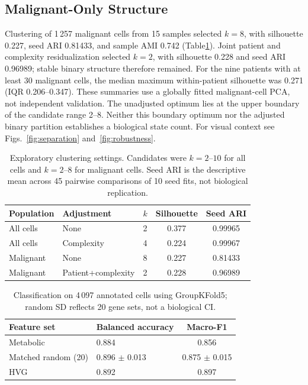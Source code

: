 \subsection{Malignant-Only Structure}
Clustering of 1\,257 malignant cells from 15 samples selected $k=8$, with silhouette 0.227, seed ARI 0.81433, and sample AMI 0.742 (Table\ref{tab:clustering}). Joint patient and complexity residualization selected $k=2$, with silhouette 0.228 and seed ARI 0.96989; stable binary structure therefore remained. For the nine patients with at least 30 malignant cells, the median maximum within-patient silhouette was 0.271 (IQR 0.206--0.347). These summaries use a globally fitted malignant-cell PCA, not independent validation. The unadjusted optimum lies at the upper boundary of the candidate range 2--8. Neither this boundary optimum nor the adjusted binary partition establishes a biological state count. For visual context see Figs.~\ref{fig:separation} and~\ref{fig:robustness}.

\begin{table}[htbp]
\centering
\small
\caption{Exploratory clustering settings. Candidates were $k=2$--$10$ for all cells and $k=2$--$8$ for malignant cells. Seed ARI is the descriptive mean across 45 pairwise comparisons of 10 seed fits, not biological replication.}
\label{tab:clustering}
\begin{tabular}{llccc}
\toprule
Population & Adjustment & $k$ & Silhouette & Seed ARI \\
\midrule
All cells & None & 2 & 0.377 & 0.99965 \\
All cells & Complexity & 4 & 0.224 & 0.99967 \\
Malignant & None & 8 & 0.227 & 0.81433 \\
Malignant & Patient+complexity & 2 & 0.228 & 0.96989 \\
\bottomrule
\end{tabular}
\end{table}

\begin{table}[htbp]
\centering
\small
\caption{Classification on 4\,097 annotated cells using GroupKFold5; random SD reflects 20 gene sets, not a biological CI.}
\label{tab:classification}
\begin{tabular}{llc}
\toprule
Feature set & Balanced accuracy & Macro-F1 \\
\midrule
Metabolic & 0.884 & 0.856 \\
Matched random (20) & 0.896 $\pm$ 0.013 & 0.875 $\pm$ 0.015 \\
HVG & 0.892 & 0.897 \\
\bottomrule
\end{tabular}
\end{table}
